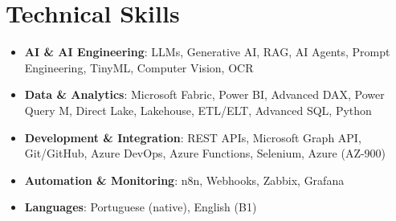 \documentclass[letterpaper,11pt]{article}
\newcommand{\resumeSubHeadingListStart}{\begin{itemize}[leftmargin=*]}
\newcommand{\resumeSubHeadingListEnd}{\end{itemize}}
\begin{document}
\section{Technical Skills}
  \resumeSubHeadingListStart
    \item{
      \textbf{AI \& AI Engineering}{: LLMs, Generative AI, RAG, AI Agents, Prompt Engineering, TinyML, Computer Vision, OCR}
    }
    \item{
      \textbf{Data \& Analytics}{: Microsoft Fabric, Power BI, Advanced DAX, Power Query M, Direct Lake, Lakehouse, ETL/ELT, Advanced SQL, Python}
    }
    \item{
      \textbf{Development \& Integration}{: REST APIs, Microsoft Graph API, Git/GitHub, Azure DevOps, Azure Functions, Selenium, Azure (AZ-900)}
    }
    \item{
      \textbf{Automation \& Monitoring}{: n8n, Webhooks, Zabbix, Grafana}
    }
    \item{
      \textbf{Languages}{: Portuguese (native), English (B1)}
    }
  \resumeSubHeadingListEnd


\end{document}
